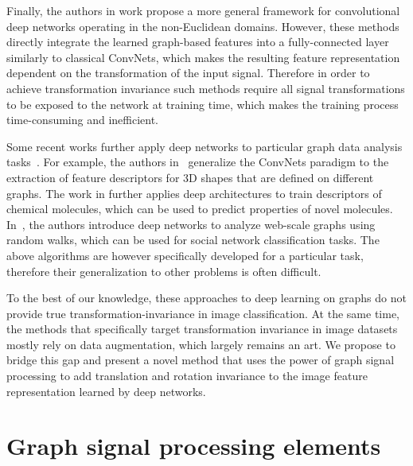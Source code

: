 \documentclass[10pt,journal,compsoc]{IEEEtran}
\newcommand{\renata}[1]{\textcolor{black}{#1}}
\begin{document}
	Finally, the authors in work \cite{bb:MontiBMRSB17} propose a more general framework for convolutional deep networks operating in the non-Euclidean domains. However, these methods directly integrate the learned graph-based features into a fully-connected layer similarly to classical ConvNets, which makes the resulting feature representation dependent on the transformation of the input signal. Therefore in order to achieve transformation invariance such methods require all signal transformations to be exposed to the network at training time, which makes the training process time-consuming and inefficient.

	Some recent works further apply deep networks to particular graph data analysis tasks~\cite{bb:bronstein2017geometric}. For example, the authors in~\cite{bb:bronsteingeodesicconv} generalize the ConvNets paradigm to the extraction of feature descriptors for 3D shapes that are defined on different graphs. The work in \cite{bb:nips_fingerprint} further applies deep architectures to train descriptors of chemical molecules, which can be used to predict properties of novel molecules. In~\cite{bb:deepwalk}, the  authors introduce deep networks to analyze web-scale graphs using random walks, which can be used for social network classification tasks. The above algorithms are however specifically developed for a particular task, therefore their generalization to other problems is often difficult.

	To the best of our knowledge, these approaches to deep learning on graphs do not provide true transformation-invariance in image classification. At the same time, the methods that specifically target transformation invariance in image datasets mostly rely on data augmentation, which largely remains an art. We propose to bridge this gap and present a novel method that uses the power of graph signal processing to add translation and rotation invariance to the image feature representation learned by deep networks.





	\section{Graph signal processing elements}
	\label{s:gsp}
\end{document}
